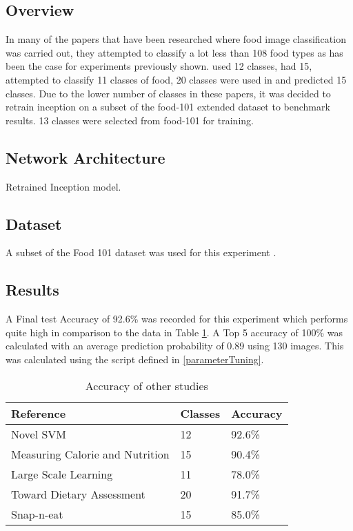 \subsection*{Overview}
In many of the papers that have been researched where food image classification was carried out, they attempted to classify a lot less than 108 food types as has been the case for experiments previously shown.
\parencite{novelSVM} used 12 classes, \parencite{pouladzadeh2014measuring} had 15, \parencite{LSL_2015} attempted to classify 11 classes of food, 20 classes were used in \parencite{chen2010toward} and \parencite{snap} predicted 15 classes.
Due to the lower number of classes in these papers, it was decided to retrain inception on a subset of the food-101 extended dataset to benchmark results.
13 classes were selected from food-101 for training.

\subsection*{Network Architecture}
Retrained Inception model.

\subsection*{Dataset}
A subset of the Food 101 dataset was used for this experiment \parencite{food101}.

\subsection*{Results}
A Final test Accuracy of 92.6\% was recorded for this experiment which performs quite high in comparison to the data in Table \ref{classes_accuracy}.
A Top 5 accuracy of 100\% was calculated with an average prediction probability of 0.89 using 130 images.
This was calculated using the script defined in \ref{parameterTuning}.

\begin{table}[]
\centering
\caption{Accuracy of other studies}
\label{classes_accuracy}
\begin{tabular}{|l|l|l|}
\hline
\textbf{Reference}                       & \textbf{Classes} & \textbf{Accuracy}      \\ \hline
Novel SVM                       & 12      & 92.6\%        \\ \hline
Measuring Calorie and Nutrition & 15      & 90.4\%       \\ \hline
Large Scale Learning            & 11      & 78.0\%          \\ \hline
Toward Dietary Assessment       & 20      & 91.7\% \\ \hline
Snap-n-eat                      & 15      & 85.0\%         \\ \hline
\end{tabular}
\end{table}

